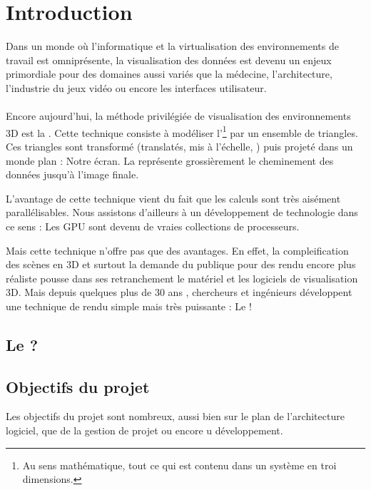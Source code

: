 \section{Introduction}
Dans un monde où l'informatique et la virtualisation des environnements de
travail est omniprésente, la visualisation des données est devenu un enjeux
primordiale pour des domaines aussi variés que la médecine, l'architecture,
l'industrie du jeux vidéo ou encore les interfaces utilisateur.

\paragraph{}
Encore aujourd'hui, la méthode privilégiée de visualisation des environnements
3D est la . Cette technique consiste à modéliser
l'\footnote{Au sens mathématique, \ie tout ce qui est contenu
dans un système en troi dimensions.} par un ensemble de triangles. Ces
triangles sont transformé (\ie translatés, mis à l'échelle, \etc) puis projeté
dans un monde plan : Notre écran. La  représente
grossièrement le cheminement des données jusqu'à l'image finale.



L'avantage de cette technique vient du fait que les calculs sont très
aisément parallélisables. Nous assistons d'ailleurs à un développement de
technologie dans ce sens : Les \gls{GPU} sont devenu de vraies collections de
processeurs.

\newpar Mais cette technique n'offre pas que des avantages. En effet, la
compleification des scènes en 3D et surtout la demande du publique pour des
rendu encore plus réaliste pousse dans ses retranchement le matériel et les
logiciels de visualisation 3D. Mais depuis quelques plus de 30 ans
\cite{Whitted1980}, chercheurs et ingénieurs développent une technique de
rendu simple mais très puissante : Le \raytracing !

\subsection{Le \raytracing ?}

\subsection{Objectifs du projet}
Les objectifs du projet sont nombreux, aussi bien sur le plan de
l'architecture logiciel, que de la gestion de projet ou encore u
développement.

